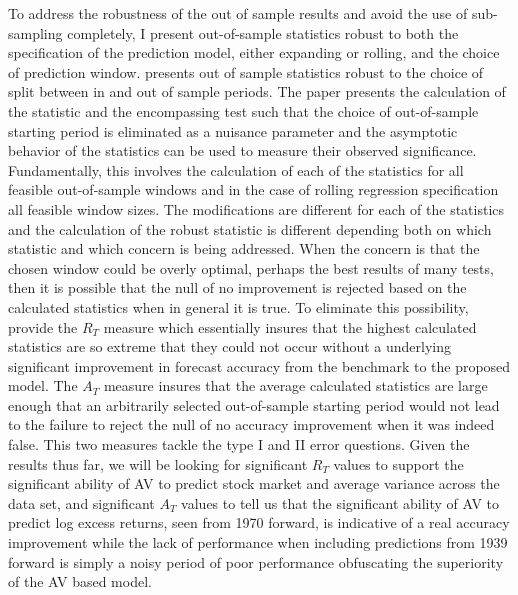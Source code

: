 To address the robustness of the out of sample results and avoid the use of sub-sampling completely, I present out-of-sample statistics robust to both the specification of the prediction model, either expanding or rolling, and the choice of prediction window. \cite{rossi_out--sample_2012} presents out of sample statistics robust to the choice of split between in and out of sample periods. The paper presents the calculation of the \citet{Diebold1995} statistic and the \citet{harvey_tests_1998} encompassing test such that the choice of out-of-sample starting period is eliminated as a nuisance parameter and the asymptotic behavior of the statistics can be used to measure their observed significance. Fundamentally, this involves the calculation of each of the statistics for all feasible out-of-sample windows and in the case of rolling regression specification all feasible window sizes. The modifications are different for each of the statistics and the calculation of the robust statistic is different depending both on which statistic and which concern is being addressed. When the concern is that the chosen window could be overly optimal, perhaps the best results of many tests, then it is possible that the null of no improvement is rejected based on the calculated statistics when in general it is true. To eliminate this possibility, \citet{rossi_out--sample_2012} provide the $R_{T}$ measure which essentially insures that the highest calculated statistics are so extreme that they could not occur without a underlying significant improvement in forecast accuracy from the benchmark to the proposed model. The $A_{T}$ measure insures that the average calculated statistics are large enough that an arbitrarily selected out-of-sample starting period would not lead to the failure to reject the null of no accuracy improvement when it was indeed false. This two measures tackle the type I and II error questions. Given the results thus far, we will be looking for significant $R_{T}$ values to support the significant ability of AV to predict stock market and average variance across the data set, and significant $A_{T}$ values to tell us that the significant ability of AV to predict log excess returns, seen from 1970 forward, is indicative of a real accuracy improvement while the lack of performance when including predictions from 1939 forward is simply a noisy period of poor performance obfuscating the superiority of the AV based model.

